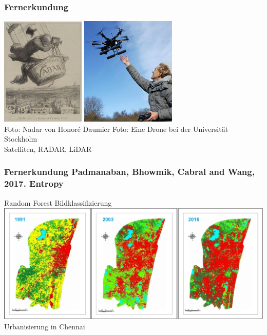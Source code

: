 \documentclass{beamer}
\begin{document}
\begin{frame}
\frametitle{Fernerkundung}
\vspace{0.2cm}\includegraphics[width=0.3\textwidth]{Figures/remote_sensing.png}
\hspace{1cm}\includegraphics[width=0.34\textwidth]{Figures/drone.png}\\
\tiny Foto: Nadar von Honoré Daumier 
\hspace{1.1cm} Foto: Eine Drone bei der Universität Stockholm\\[0.5cm]
Satelliten, RADAR, LiDAR

\end{frame}


\begin{frame}
\frametitle{Fernerkundung \hspace{1cm} \tiny Padmanaban, Bhowmik, Cabral and Wang, 2017. Entropy}
Random Forest Bildklassifizierung
\includegraphics[width=1.05\textwidth]{Figures/RS1.png}\\
Urbanisierung in Chennai
\end{frame}
\end{document}
